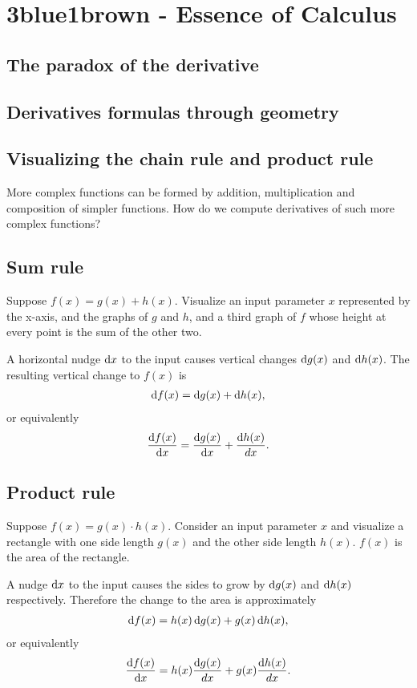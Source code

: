 \renewcommand{\pzpx}{\frac{\partial z}{\partial x}}
\renewcommand{\pzpy}{\frac{\partial z}{\partial y}}


\section{3blue1brown - Essence of Calculus}
\subsection{The paradox of the derivative}
\subsection{Derivatives formulas through geometry}
\subsection{Visualizing the chain rule and product rule}

More complex functions can be formed by addition, multiplication and
composition of simpler functions. How do we compute derivatives of such more
complex functions?

\subsection{Sum rule}
Suppose $f(x) = g(x) + h(x)$. Visualize an input parameter $x$ represented by
the x-axis, and the graphs of $g$ and $h$, and a third graph of $f$ whose
height at every point is the sum of the other two.

A horizontal nudge $\dx$ to the input causes vertical changes $\d g(x)$ and
$\d h(x)$. The resulting vertical change to $f(x)$ is
\begin{align*}
  \d f(x) = \d g(x) + \d h(x),
\end{align*}
or equivalently
\begin{align*}
  \frac{\d f(x)}{\dx} = \frac{\d g(x)}{\dx} + \frac{\d h(x)}{dx}.
\end{align*}


\newpage
\subsection{Product rule}
Suppose $f(x) = g(x) \cdot h(x)$. Consider an input parameter $x$ and visualize a
rectangle with one side length $g(x)$ and the other side length $h(x)$. $f(x)$
is the area of the rectangle.

A nudge $\dx$ to the input causes the sides to grow by $\d g(x)$ and $\d h(x)$
respectively. Therefore the change to the area is approximately
\begin{align*}
  \d f(x) = h(x) \d g(x) + g(x) \d h(x),
\end{align*}
or equivalently
\begin{align*}
  \frac{\d f(x)}{\dx} = h(x) \frac{\d g(x)}{dx} + g(x) \frac{\d h(x)}{dx}.
\end{align*}

